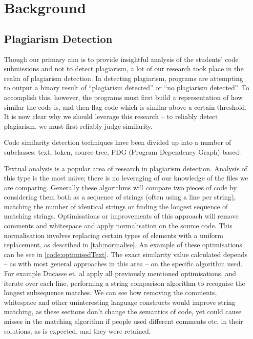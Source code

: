 \chapter{Background}

\label{Background}


\section{Plagiarism Detection}

Though our primary aim is to provide insightful analysis of the students' code 
submissions and not to detect plagiarism, a lot of our research took 
place in the realm of plagiarism detection. In detecting plagiarism, programs are attempting
to output a binary result of ``plagiarism detected'' or ``no plagiarism detected''.
To accomplish this, however, the programs must first build a representation of 
how similar the code is, and then flag code which is similar above a certain threshold.
It is now clear why we should leverage this research -- to reliably detect plagiarism,
we must first reliably judge similarity.

Code similarity detection techniques have been divided up into a number of subclasses:
text, token, source tree, PDG (Program Dependency Graph) based\cite{CloneDetection}.

Textual analysis is a popular area of research in plagiarism
detection. Analysis of this type is the most na\"{\i}ve; there is no leveraging
of our knowledge of the files we are comparing. Generally these algorithms
will compare two pieces of code by considering them both as a sequence of
strings (often using a line per string), matching the number of identical
strings or finding the longest sequence of matching strings. 
Optimisations or improvements of this approach will remove comments and whitespace
and apply normalisation on the source code. This normalisation involves replacing
certain types of elements with a uniform replacement, as described in 
\cref{tab:normalise}. An example of these optimisations can be see in 
\cref{code:optimisedText}. The exact similarity value calculated depends -- as
with most general approaches in this area -- on the specific algorithm used.
For example Ducasse et. al\cite{DucasseText} apply all previously mentioned optimisations,
and iterate over each line, performing a string comparison algorithm to recognise
the longest subsequence matches. We can see how removing the comments,
whitespace and other uninteresting language constructs would improve string
matching, as these sections don't change the semantics of code, yet could cause
misses in the matching algorithm if people used different comments etc. in
their solutions, as is expected, and they were retained.


